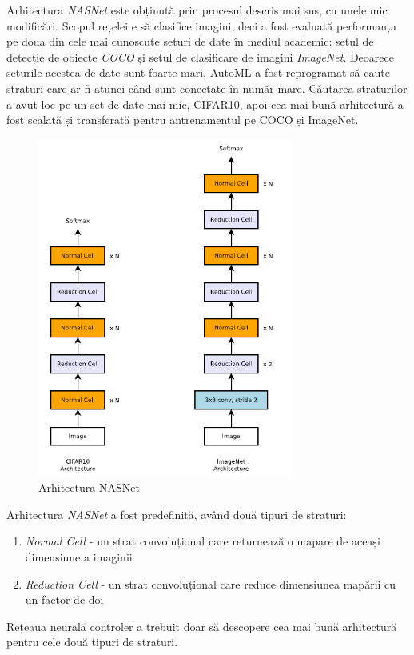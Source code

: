 Arhitectura \textit{NASNet} este obținută prin procesul descris mai sus, cu unele mic modificări. Scopul rețelei e să clasifice imagini, deci a fost evaluată performanța pe doua din cele mai cunoscute seturi de date în mediul academic: setul de detecție de obiecte \textit{COCO} și setul de clasificare de imagini \textit{ImageNet}. Deoarece seturile acestea de date sunt foarte mari, AutoML a fost reprogramat să caute straturi care ar fi atunci când sunt conectate în număr mare. Căutarea straturilor a avut loc pe un set de date mai mic, CIFAR10, apoi cea mai bună arhitectură a fost scalată și transferată pentru antrenamentul pe COCO și ImageNet.\cite{DBLP:journals/corr/ZophVSL17}



\begin{figure}[!htbp]
    \begin{center}
        \includegraphics[width=0.75\textwidth]{images/nasnet.png}
        \caption{Arhitectura NASNet \cite{DBLP:journals/corr/ZophVSL17}}
    \end{center}
\end{figure}
Arhitectura \textit{NASNet} a fost predefinită, având două tipuri de straturi:
\begin{enumerate}
    \item \textit{Normal Cell} - un strat convoluțional care returnează o mapare de aceași dimensiune a imaginii
    \item \textit{Reduction Cell} - un strat convoluțional care reduce dimensiunea mapării cu un factor de doi
\end{enumerate}{}
Rețeaua neurală controler a trebuit doar să descopere cea mai bună arhitectură pentru cele două tipuri de straturi.


